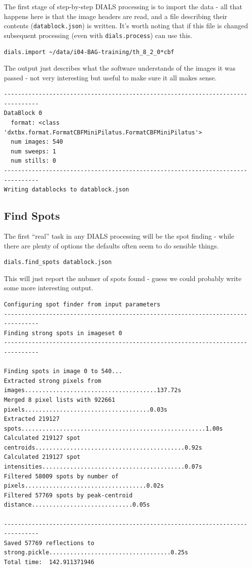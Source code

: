 \documentclass[a4paper, 11pt]{article}
\begin{document}
The first stage of step-by-step DIALS processing is to import the data
- all that happens here is that the image headers are read, and a file
describing their contents (\verb|datablock.json|) is written. It's
worth noting that if this file is changed subsequent processing (even
with \verb|dials.process|) can use this.

{\small
\begin{verbatim}
dials.import ~/data/i04-BAG-training/th_8_2_0*cbf
\end{verbatim}
}

\noindent 
The output just describes what the software understands of the images
it was passed - not very interesting but useful to make sure it all
makes sense.

{\small
\begin{verbatim}
--------------------------------------------------------------------------------
DataBlock 0
  format: <class 'dxtbx.format.FormatCBFMiniPilatus.FormatCBFMiniPilatus'>
  num images: 540
  num sweeps: 1
  num stills: 0
--------------------------------------------------------------------------------
Writing datablocks to datablock.json
\end{verbatim}
}

\subsection{Find Spots}

The first ``real'' task in any DIALS processing will be the spot
finding - while there are plenty of options the defaults often seem to
do sensible things.

{\small
\begin{verbatim}
dials.find_spots datablock.json 
\end{verbatim}
}

\noindent
This will just report the nubmer of spots found - guess we could
probably write some more interesting output.

{\small
\begin{verbatim}
Configuring spot finder from input parameters
--------------------------------------------------------------------------------
Finding strong spots in imageset 0
--------------------------------------------------------------------------------

Finding spots in image 0 to 540...
Extracted strong pixels from images......................................137.72s
Merged 8 pixel lists with 922661 pixels....................................0.03s
Extracted 219127 spots.....................................................1.00s
Calculated 219127 spot centroids...........................................0.92s
Calculated 219127 spot intensities.........................................0.07s
Filtered 58009 spots by number of pixels...................................0.02s
Filtered 57769 spots by peak-centroid distance.............................0.05s

--------------------------------------------------------------------------------
Saved 57769 reflections to strong.pickle...................................0.25s
Total time:  142.911371946 
\end{verbatim}
}
\end{document}
